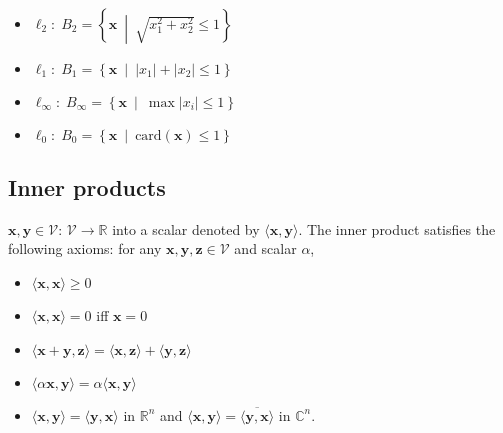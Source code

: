     \begin{example}
        \begin{itemize}
            \item \( \ell_2: \; B_2 = \left\{ \mathbf{x} \ \middle| \ \sqrt{x_1^2 + x_2^2} \leq 1 \right\} \)
            \item \( \ell_1: \; B_1 = \left\{ \mathbf{x} \ \middle| \ |x_1| + |x_2| \leq 1 \right\} \)
            \item \( \ell_\infty: \; B_\infty = \left\{ \mathbf{x} \ \middle| \ \max |x_i| \leq 1 \right\} \)
            \item \( \ell_0: \; B_0 = \left\{ \mathbf{x} \ \middle| \ \text{card}(\mathbf{x}) \leq 1 \right\} \)
        \end{itemize}

    \end{example}
\subsection{Inner products}
\begin{definition}
    \( \mathbf{x}, \mathbf{y} \in \mathcal{V} \): $\mathcal{V}\rightarrow \mathbb{R}$ into a scalar denoted by \( \langle \mathbf{x}, \mathbf{y} \rangle \). The inner product satisfies the following axioms: for any \( \mathbf{x}, \mathbf{y}, \mathbf{z} \in \mathcal{V} \) and scalar \( \alpha \),

    \begin{itemize}
        \item \( \langle \mathbf{x}, \mathbf{x} \rangle \geq 0 \)
        \item \( \langle \mathbf{x}, \mathbf{x} \rangle = 0 \) iff \( \mathbf{x} = 0 \)
        \item \( \langle \mathbf{x} + \mathbf{y}, \mathbf{z} \rangle = \langle \mathbf{x}, \mathbf{z} \rangle + \langle \mathbf{y}, \mathbf{z} \rangle \)
        \item \( \langle \alpha \mathbf{x}, \mathbf{y} \rangle = \alpha \langle \mathbf{x}, \mathbf{y} \rangle \)
        \item \( \langle \mathbf{x}, \mathbf{y} \rangle = \langle \mathbf{y}, \mathbf{x} \rangle \) in $\mathbb{R}^n$ and \( \langle \mathbf{x}, \mathbf{y} \rangle = \overline{\langle \mathbf{y}, \mathbf{x} \rangle} \) in \( \mathbb{C}^n \).
    \end{itemize}
\end{definition}

